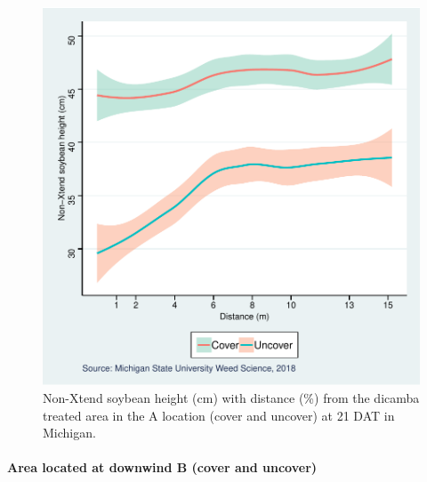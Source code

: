 \documentclass[]{article}
\let\oldparagraph\paragraph
\renewcommand{\paragraph}[1]{\oldparagraph{#1}\mbox{}}
\begin{document}
\begin{figure}
\centering
\includegraphics{Report_Dicamba_study_files/figure-latex/unnamed-chunk-57-1.pdf}
\caption{Non-Xtend soybean height (cm) with distance (\%) from the
dicamba treated area in the A location (cover and uncover) at 21 DAT in
Michigan.}
\end{figure}

\newpgae
\pagebreak

\paragraph{Area located at downwind B (cover and
uncover)}\label{area-located-at-downwind-b-cover-and-uncover-1}
\end{document}
